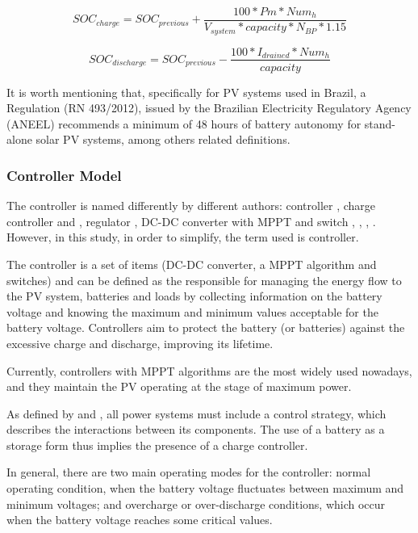 \begin{equation}
\label{eq:charge}
SOC_{charge} = SOC_{previous} + \dfrac{100*Pm*Num_{h}}{V_{system}*capacity*N_{BP}*1.15}
\end{equation}

\begin{equation}
\label{eq:discharge}
SOC_{discharge} = SOC_{previous} - \dfrac{100*I_{drained}*Num_{h}}{capacity}
\end{equation}

It is worth mentioning that, specifically for PV systems used in Brazil, a Regulation (RN 493/2012), issued by the Brazilian Electricity Regulatory Agency (ANEEL) recommends a minimum of 48 hours of battery autonomy for stand-alone solar PV systems, among others related definitions.

\subsubsection{Controller Model}
\label{sec:controller}

The controller is named differently by different authors: controller \cite{Hansen}, charge controller \cite{Mahanta} and \cite{Chauhan}, regulator \cite{Mellit}, DC-DC converter with MPPT and switch \cite{Dhanowa}, \cite{Yatimi}, \cite{Abdulateef}, \cite{Roy}. However, in this study, in order to simplify, the term used is controller. 

The controller is a set of items (DC-DC converter, a MPPT algorithm and switches) and can be defined as the responsible for managing the energy flow to the PV system, batteries and loads by collecting information on the battery voltage and knowing the maximum and minimum values acceptable for the battery voltage. Controllers aim to protect the battery (or batteries) against the excessive charge and discharge, improving its lifetime. 

Currently, controllers with MPPT algorithms are the most widely used nowadays,  and they maintain the PV operating at the stage of maximum power.

As defined by \cite{Hansen} and \cite{Mellit}, all power systems must include a control strategy, which describes the interactions between its components. The use of a battery as a storage form thus implies the presence of a charge controller. 

In general, there are two main operating modes for the controller: normal operating condition, when the battery voltage fluctuates between maximum and minimum voltages; and overcharge or over-discharge conditions, which occur when the battery voltage reaches some critical values. 

